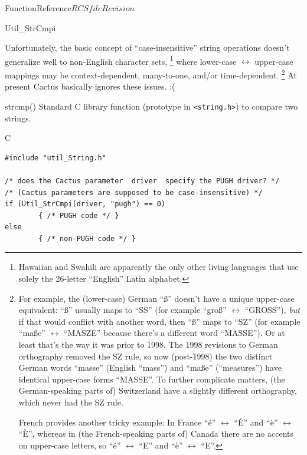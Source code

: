 \begin{cactuspart}{FunctionReference}{$RCSfile$}{$Revision$}
\begin{FunctionDescription}{Util\_StrCmpi}
\begin{Discussion}
Unfortunately, the basic concept of ``case-insensitive'' string
operations doesn't generalize well to non-English character sets,%
\footnote{%
	 Hawaiian and Swahili are apparently the only
	 other living languages that use solely the
	 26-letter ``English'' Latin alphabet.
	 }%
{} where lower-case $\leftrightarrow$ upper-case mappings may be
context-dependent, many-to-one, and/or time-dependent.%
\footnote{%
	 For example, the (lower-case) German ``\ss''
	 doesn't have a unique upper-case equivalent:
	 ``\ss'' usually maps to ``SS''
	 (for example ``gro\ss'' $\leftrightarrow$ ``GROSS''),
	 {\em but\/} if that would conflict
	 with another word, then ``\ss'' maps to ``SZ''
	 (for example ``ma\ss{}e'' $\leftrightarrow$ ``MASZE''
	 because there's a different word ``MASSE'').
	 Or at least that's the way it was prior to 1998.
	 The 1998 revisions to German orthography
	 removed the SZ rule, so now (post-1998) the two
	 distinct German words ``masse'' (English ``mass'')
	 and ``ma\ss{}e'' (``measures'') have identical
	 upper-case forms ``MASSE''.  To further complicate
	 matters, (the German-speaking parts of) Switzerland
	 have a slightly different orthography, which never
	 had the SZ rule.

	 French provides another tricky example:
	 In France ``\'e'' $\leftrightarrow$ ``\'E'' and
	 ``\`e'' $\leftrightarrow$ ``\`E'',
	 whereas in (the French-speaking parts of) Canada
	 there are no accents on upper-case letters, so
	 ``\'e'' $\leftrightarrow$ ``E'' and
	 ``\`e'' $\leftrightarrow$ ``E''.
	 }%
{}  At present Cactus basically ignores these issues. :(
\end{Discussion}

\begin{SeeAlsoSection}
\begin{SeeAlso}{strcmp()}
Standard C library function (prototype in \verb|<string.h>|)
to compare two strings.
\end{SeeAlso}
\end{SeeAlsoSection}

\begin{ExampleSection}
\begin{Example}{C}
\begin{verbatim}
#include "util_String.h"

/* does the Cactus parameter  driver  specify the PUGH driver? */
/* (Cactus parameters are supposed to be case-insensitive) */
if (Util_StrCmpi(driver, "pugh") == 0)
        { /* PUGH code */ }
else
        { /* non-PUGH code */ }
\end{verbatim}
\end{Example}
\end{ExampleSection}
\end{FunctionDescription}


\end{cactuspart}
